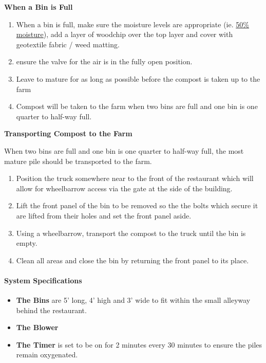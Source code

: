 \textbf{When a Bin is Full}

\begin{enumerate}
\def\labelenumi{\arabic{enumi}.}
\itemsep1pt\parskip0pt
\item
  When a bin is full, make sure the moisture levels are appropriate (ie.
  \hyperref[50moisture]{50\% moisture}), add a layer of woodchip over
  the top layer and cover with geotextile fabric / weed matting.
\item
  ensure the valve for the air is in the fully open position.
\item
  Leave to mature for as long as possible before the compost is taken up
  to the farm
\item
  Compost will be taken to the farm when two bins are full and one bin
  is one quarter to half-way full.
\end{enumerate}

\textbf{Transporting Compost to the Farm}

When two bins are full and one bin is one quarter to half-way full, the
most mature pile should be transported to the farm.

\begin{enumerate}
\def\labelenumi{\arabic{enumi}.}
\itemsep1pt\parskip0pt
\item
  Position the truck somewhere near to the front of the restaurant which
  will allow for wheelbarrow access via the gate at the side of the
  building.
\item
  Lift the front panel of the bin to be removed so the the bolts which
  secure it are lifted from their holes and set the front panel aside.
\item
  Using a wheelbarrow, transport the compost to the truck until the bin
  is empty.
\item
  Clean all areas and close the bin by returning the front panel to its
  place.
\end{enumerate}

\paragraph{System Specifications}\label{system-specifications}

\begin{itemize}
\itemsep1pt\parskip0pt
\item
  \textbf{The Bins} are 5' long, 4' high and 3' wide to fit within the
  small alleyway behind the restaurant.
\item
  \textbf{The Blower}
\item
  \textbf{The Timer} is set to be on for 2 minutes every 30 minutes to
  ensure the piles remain oxygenated.
\end{itemize}

